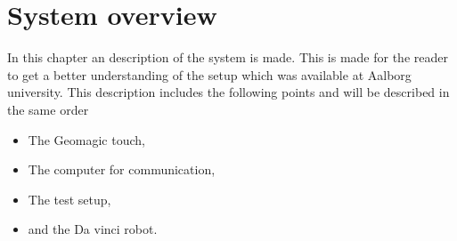 \chapter{System overview}\label{cha:overview}

In this chapter an description of the system is made. This is made for the reader to get a better understanding of the setup which was available at Aalborg university. This description includes the following points and will be described in the same order

\begin{itemize}
  \item The Geomagic touch,
  \item The computer for communication,
  \item The test setup,
  \item and the Da vinci robot.
\end{itemize}



%

%





%



